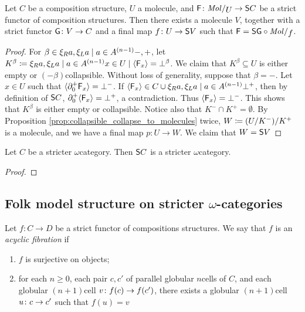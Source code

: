 \begin{prop} \label{prop:factor_molecin_into_sus}
    Let \( C \) be a composition structure, \( U \) a molecule, and \( \F \colon \molecin{U} \to \sus{C} \) be a strict functor of composition structures.
    Then there exists a molecule \( V \), together with a strict functor \( \G \colon V \to C \) and a final map \( f \colon U \to \sus{V} \) such that \( \F = \sus{\G} \after \molecin{f} \).  
\end{prop}
\begin{proof}
    For \( \beta \in \set{-, +} \), let \( K^{\beta} \eqdef \set{x \in U \mid \pcell{\F_x} = \bot^{\beta}} \).
    We claim that \( K^\beta \subseteq U \) is either empty or \( (- \beta) \)\nbd collapsible.
    Without loss of generality, suppose that \( \beta = - \).
    Let \( x \in U \) such that \( \pcell{\bd{0}{+} \F_x} = \bot^- \).
    If \( \pcell{\F_x} \in C \cup \set{\bot^+} \), then by definition of \( \sus{C} \), \( \bd{0}{+} \pcell{\F_x} = \bot^+ \), a contradiction.
    Thus \( \pcell{\F_x} = \bot^- \).
    This shows that \( K^\beta \) is either empty or collapsible.
    Notice also that \( K^- \cap K^+ = \emptyset \).
    By Proposition \ref{prop:collapsible_collapse_to_molecules} twice, \( W \eqdef \coll{K^+}{(\coll{K^-}{U})} \) is a molecule, and we have a final map \( p \colon U \to W \).
    We claim that \( W = \sus{V} \)

\end{proof}

\begin{thm} \label{thm:stricter_preserves_suspensions}
    Let \( C \) be a stricter \( \omega \)\nbd category.
    Then \( \sus{C} \) is a stricter \( \omega \)\nbd category.
\end{thm}
\begin{proof}
\end{proof}

\subsection{Folk model structure on stricter \texorpdfstring{$\omega$}{}-categories}

\begin{dfn}  \label{dfn:acyclic_fibration}
    Let \( f \colon C \to D \) be a strict functor of compositions structures.
    We say that \( f \) is an \emph{acyclic fibration} if
    \begin{enumerate}
        \item \( f \) is surjective on objects;
        \item for each \( n \geq 0 \), each pair \( c, c' \) of parallel globular \( n \)\nbd cells of \( C \), and each globular \( (n + 1) \)\nbd cell \( v \colon f(c) \gcelto f(c') \), there exists a globular \( (n + 1) \)\nbd cell \( u \colon c \gcelto c' \) such that \( f(u) = v \)
    \end{enumerate}
\end{dfn}

